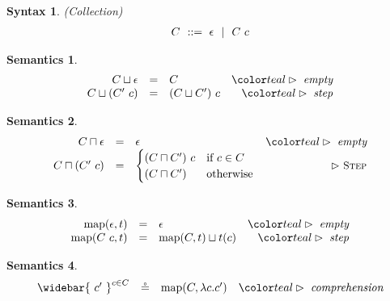 \documentclass[acmsmall]{acmart}
\newtheorem{syntax}{Syntax}[section]
\newtheorem{semantics}{Semantics}[section]
\begin{document}
\begin{syntax}(Collection)
  \[\begin{array}[t]{r@{}l}
    \nonterm{C} & \is \epsilon \sep C\ c
  \end{array}\]
\end{syntax}
\begin{semantics}
  \[\begin{array}{rclr}
    C \sqcup \epsilon 
    &=& 
    C
    & \C{empty} 
    \\

    C \sqcup (C'\ c) 
    &=& 
    (C \sqcup C')\ c
    & \C{step} 
    \\
  \end{array}\]
\end{semantics}

\begin{semantics}
  \[\begin{array}{rclr}
    C \sqcap \epsilon 
    &=& 
    \epsilon 
    & \C{empty} 
    \\

    C \sqcap (C'\ c) 
    &=& 
    \begin{cases}
      (C \sqcap C')\ c & \text{if } c \in C\\
      (C \sqcap C') & \text{otherwise}
    \end{cases}
    & \D{Step} 
    \\
  \end{array}\]
\end{semantics}


\begin{semantics}
  \[\begin{array}{rclr}
    \text{map}(\epsilon, t)
    &=& 
    \epsilon
    & \C{empty} 
    \\

    \text{map}(C\ c, t)
    &=& 
    \text{map}(C, t) \sqcup t(c)
    & \C{step} 
    \\
  \end{array}\]
\end{semantics}

\begin{semantics}
  \[\begin{array}{rclr}
    \widebar{\ c'\ }^{c \in C} 
    &\circeq& 
    \text{map}(C, \lambda c . c')
    & \C{comprehension} 
    \\
  \end{array}\]
\end{semantics}
\end{document}
